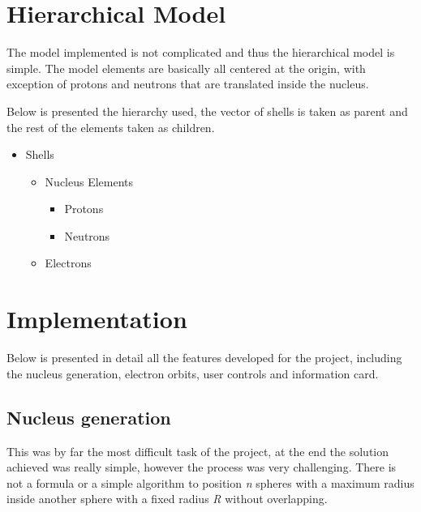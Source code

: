 \documentclass{article}
\begin{document}

\section{Hierarchical Model}

The model implemented is not complicated and thus the hierarchical model is simple. The model elements are basically all centered at the origin, with exception of protons and neutrons that are translated inside the nucleus.

Below is presented the hierarchy used, the vector of shells is taken as parent and the rest of the elements taken as children.

\begin{itemize}
	\item Shells
		\begin{itemize}
			\item Nucleus Elements
			\begin{itemize}
				\item Protons
				\item Neutrons
			\end{itemize}
			\item Electrons
		\end{itemize}
\end{itemize}


\section{Implementation}

Below is presented in detail all the features developed for the project, including the nucleus generation, electron orbits, user controls and information card.

\subsection{Nucleus generation}

This was by far the most difficult task of the project, at the end the solution achieved was really simple, however the process was very challenging. There is not a formula or a simple algorithm to position \textit{n} spheres with a maximum radius inside another sphere with a fixed radius \textit{R} without overlapping.
\end{document}
